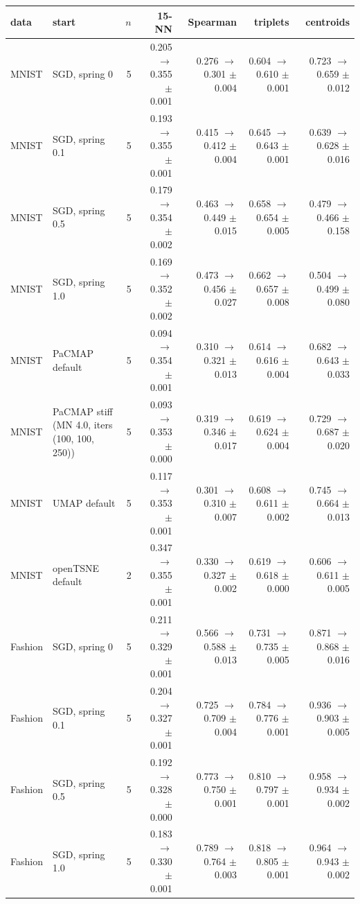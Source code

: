 \begin{tabular}{llrrrrr}
\toprule
data & start & $n$ & 15-NN & Spearman & triplets & centroids \\
\midrule
MNIST & \magnet{} SGD, spring 0 & 5 & 0.205 $\to$ 0.355 $\pm$ 0.001 & 0.276 $\to$ 0.301 $\pm$ 0.004 & 0.604 $\to$ 0.610 $\pm$ 0.001 & 0.723 $\to$ 0.659 $\pm$ 0.012 \\
MNIST & \magnet{} SGD, spring 0.1 & 5 & 0.193 $\to$ 0.355 $\pm$ 0.001 & 0.415 $\to$ 0.412 $\pm$ 0.004 & 0.645 $\to$ 0.643 $\pm$ 0.001 & 0.639 $\to$ 0.628 $\pm$ 0.016 \\
MNIST & \magnet{} SGD, spring 0.5 & 5 & 0.179 $\to$ 0.354 $\pm$ 0.002 & 0.463 $\to$ 0.449 $\pm$ 0.015 & 0.658 $\to$ 0.654 $\pm$ 0.005 & 0.479 $\to$ 0.466 $\pm$ 0.158 \\
MNIST & \magnet{} SGD, spring 1.0 & 5 & 0.169 $\to$ 0.352 $\pm$ 0.002 & 0.473 $\to$ 0.456 $\pm$ 0.027 & 0.662 $\to$ 0.657 $\pm$ 0.008 & 0.504 $\to$ 0.499 $\pm$ 0.080 \\
MNIST & PaCMAP default & 5 & 0.094 $\to$ 0.354 $\pm$ 0.001 & 0.310 $\to$ 0.321 $\pm$ 0.013 & 0.614 $\to$ 0.616 $\pm$ 0.004 & 0.682 $\to$ 0.643 $\pm$ 0.033 \\
MNIST & PaCMAP stiff (MN 4.0, iters (100, 100, 250)) & 5 & 0.093 $\to$ 0.353 $\pm$ 0.000 & 0.319 $\to$ 0.346 $\pm$ 0.017 & 0.619 $\to$ 0.624 $\pm$ 0.004 & 0.729 $\to$ 0.687 $\pm$ 0.020 \\
MNIST & UMAP default & 5 & 0.117 $\to$ 0.353 $\pm$ 0.001 & 0.301 $\to$ 0.310 $\pm$ 0.007 & 0.608 $\to$ 0.611 $\pm$ 0.002 & 0.745 $\to$ 0.664 $\pm$ 0.013 \\
MNIST & openTSNE default & 2 & 0.347 $\to$ 0.355 $\pm$ 0.001 & 0.330 $\to$ 0.327 $\pm$ 0.002 & 0.619 $\to$ 0.618 $\pm$ 0.000 & 0.606 $\to$ 0.611 $\pm$ 0.005 \\
\midrule
Fashion & \magnet{} SGD, spring 0 & 5 & 0.211 $\to$ 0.329 $\pm$ 0.001 & 0.566 $\to$ 0.588 $\pm$ 0.013 & 0.731 $\to$ 0.735 $\pm$ 0.005 & 0.871 $\to$ 0.868 $\pm$ 0.016 \\
Fashion & \magnet{} SGD, spring 0.1 & 5 & 0.204 $\to$ 0.327 $\pm$ 0.001 & 0.725 $\to$ 0.709 $\pm$ 0.004 & 0.784 $\to$ 0.776 $\pm$ 0.001 & 0.936 $\to$ 0.903 $\pm$ 0.005 \\
Fashion & \magnet{} SGD, spring 0.5 & 5 & 0.192 $\to$ 0.328 $\pm$ 0.000 & 0.773 $\to$ 0.750 $\pm$ 0.001 & 0.810 $\to$ 0.797 $\pm$ 0.001 & 0.958 $\to$ 0.934 $\pm$ 0.002 \\
Fashion & \magnet{} SGD, spring 1.0 & 5 & 0.183 $\to$ 0.330 $\pm$ 0.001 & 0.789 $\to$ 0.764 $\pm$ 0.003 & 0.818 $\to$ 0.805 $\pm$ 0.001 & 0.964 $\to$ 0.943 $\pm$ 0.002 \\

\end{tabular}
